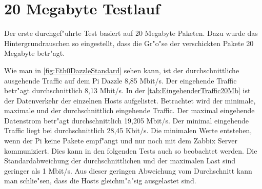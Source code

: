 \section{20 Megabyte Testlauf}
\label{subsec:20MBTest}
Der erste durchgef"uhrte Test basiert auf 20 Megabyte Paketen. Dazu wurde das Hintergrundrauschen %
so eingestellt, dass die Gr"o"se der verschickten Pakete 20 Megabyte betr"agt. 

Wie man in \cref{fig:Eth0DazzleStandard} sehen kann, ist der durchschnittliche ausgehende Traffic auf dem Pi Dazzle 8,85 Mbit/s. %
Der eingehende Traffic betr"agt durchschnittlich 8,13 Mbit/s. In der \cref{tab:EingehenderTraffic20Mb} %
ist der Datenverkehr der einzelnen Hosts aufgelistet. Betrachtet wird der minimale, maximale und der durchschnittlich eingehende Traffic. %
Der maximal eingehende Datenstrom betr"agt durchschnittlich 19,205 Mbit/s. Der minimal eingehende Traffic liegt bei %
durchschnittlich 28,45 Kbit/s. Die minimalen Werte entstehen, wenn der Pi keine Pakete empf"angt und nur noch mit dem Zabbix Server kommuniziert. %
Dies kann in den folgenden Tests auch so beobachtet werden. Die Standardabweichung der durchschnittlichen %
und der maximalen Last sind geringer als 1 Mbit/s. Aus dieser geringen Abweichung vom Durchschnitt kann man schlie"sen, dass die Hosts %
gleichm"a"sig ausgelastet sind. %

